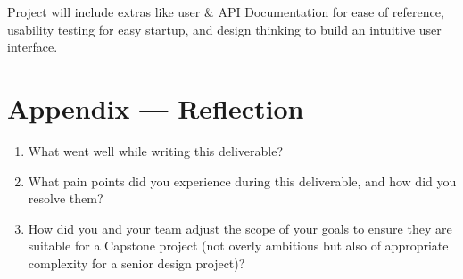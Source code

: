 \documentclass{article}
\begin{document}
\noindent
Project will include extras like user \& API Documentation for ease of reference, usability testing 
for easy startup, and design thinking to build an intuitive user interface.

\newpage{}

\section*{Appendix --- Reflection}




\begin{enumerate}
    \item What went well while writing this deliverable? 
    \item What pain points did you experience during this deliverable, and how
    did you resolve them?
    \item How did you and your team adjust the scope of your goals to ensure
    they are suitable for a Capstone project (not overly ambitious but also of
    appropriate complexity for a senior design project)?
\end{enumerate}  
\end{document}
